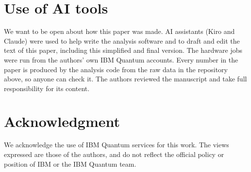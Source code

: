 \documentclass[10pt,conference]{IEEEtran}
\begin{document}
\section*{Use of AI tools}
We want to be open about how this paper was made. AI assistants (Kiro and Claude) were used to help
write the analysis software and to draft and edit the text of this paper, including this simplified
and final version. The hardware jobs were run from the authors' own IBM Quantum accounts. Every
number in the paper is produced by the analysis code from the raw data in the repository above, so
anyone can check it. The authors reviewed the manuscript and take full responsibility for its
content.

\section*{Acknowledgment}
We acknowledge the use of IBM Quantum services for this work. The views expressed are those of
the authors, and do not reflect the official policy or position of IBM or the IBM Quantum team.
\end{document}
